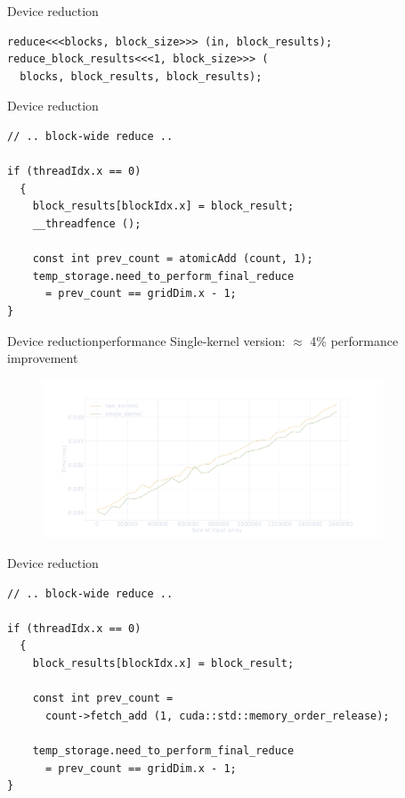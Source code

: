 \documentclass[aspectratio=169,compress]{beamer}
\begin{document}
\begin{frame}[fragile]{Device reduction}{}
\begin{lstlisting}[showstringspaces=false]
reduce<<<blocks, block_size>>> (in, block_results);
reduce_block_results<<<1, block_size>>> (
  blocks, block_results, block_results);
\end{lstlisting}
\end{frame}


\begin{frame}[fragile]{Device reduction}{}
\begin{lstlisting}[showstringspaces=false]
// .. block-wide reduce ..

if (threadIdx.x == 0)
  {
    block_results[blockIdx.x] = block_result;
    __threadfence ();

    const int prev_count = atomicAdd (count, 1);
    temp_storage.need_to_perform_final_reduce 
      = prev_count == gridDim.x - 1;
}

\end{lstlisting}
\end{frame}

\begin{frame}[fragile]{Device reduction}{performance}
Single-kernel version: $\approx$ \textcolor{NordYellow}{4\%} performance improvement
\centering
	\begin{figure}
		\includegraphics[width=0.9\textwidth]{reduce.pdf}
	\end{figure}
\end{frame}

\begin{frame}[fragile]{Device reduction}{}
\begin{lstlisting}[showstringspaces=false]
// .. block-wide reduce ..

if (threadIdx.x == 0)
  {
    block_results[blockIdx.x] = block_result;

    const int prev_count = 
      count->fetch_add (1, cuda::std::memory_order_release);

    temp_storage.need_to_perform_final_reduce 
      = prev_count == gridDim.x - 1;
}

\end{lstlisting}
\end{frame}
\end{document}
